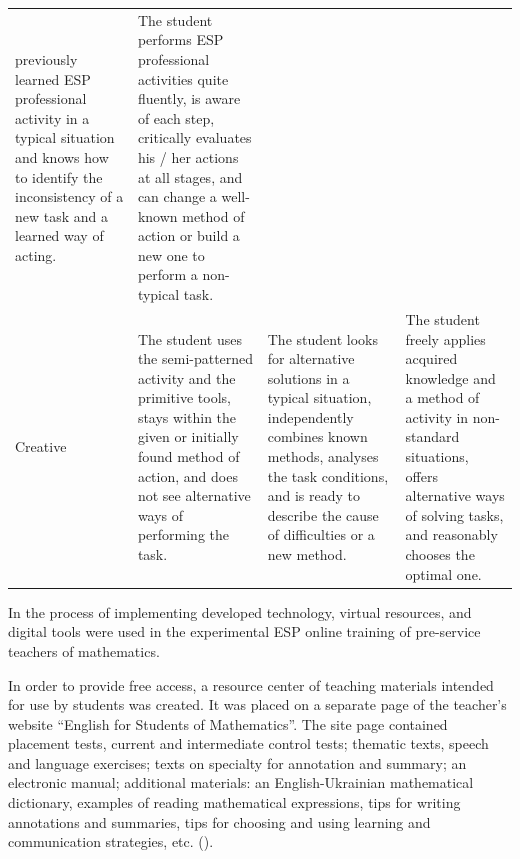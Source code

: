 \begin{table}[htpb]
\begin{threeparttable}
\begin{tabular}{ l p{4cm} p{4cm} p{4cm}}
previously learned ESP professional activity in a typical situation and
knows how to identify the inconsistency of a new task and a learned way
of acting. & The student performs ESP professional activities quite
fluently, is aware of each step, critically evaluates his / her actions
at all stages, and can change a well-known method of action or build a
new one to perform a non-typical task. \\
Creative & The student uses the semi-patterned activity and the
primitive tools, stays within the given or initially found method of
action, and does not see alternative ways of performing the task. & The
student looks for alternative solutions in a typical situation,
independently combines known methods, analyses the task conditions, and
is ready to describe the cause of difficulties or a new method. & The
student freely applies acquired knowledge and a method of activity in
non-standard situations, offers alternative ways of solving tasks, and
reasonably chooses the optimal one. \\
\bottomrule
\end{tabular}
\end{threeparttable}
\end{table}

In the process of implementing developed technology, virtual resources,
and digital tools were used in the experimental ESP online training of
pre-service teachers of mathematics.

In order to provide free access, a resource center of teaching materials
intended for use by students was created. It was placed on a separate
page of the teacher's website \enquote{English for Students of Mathematics}.
The site page contained placement tests, current and intermediate
control tests; thematic texts, speech and language exercises; texts on
specialty for annotation and summary; an electronic manual; additional
materials: an English-Ukrainian mathematical dictionary, examples of
reading mathematical expressions, tips for writing annotations and
summaries, tips for choosing and using learning and communication
strategies, etc. ().

